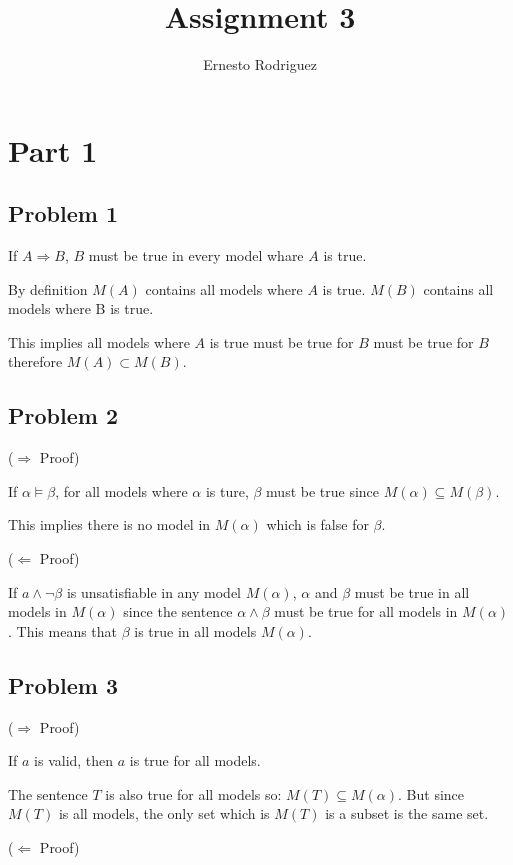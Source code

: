 \documentclass{article}
\title{Assignment 3}
\author{Ernesto Rodriguez}
\begin{document}
\maketitle

\section{Part 1}

\subsection{Problem 1}
If $A \Rightarrow B$, $B$ must be true in every model whare $A$ is true.

By definition $M(A)$ contains all models where $A$ is true. $M(B)$ contains all models where B is true.

This implies all models where $A$ is true must be true for $B$ must be true for $B$ therefore $M(A) \subset M(B)$.

\subsection{Problem 2}

($\Rightarrow$ Proof)

If $\alpha \models \beta$, for all models where $\alpha$ is ture, $\beta$ must be true since $M(\alpha) \subseteq M(\beta)$.

This implies there is no model in $M(\alpha)$ which is false for $\beta$.

($\Leftarrow$ Proof)

If $a \wedge \neg \beta $ is unsatisfiable in any model $M( \alpha )$, $\alpha $ and $\beta $ must be true in all models in $M(  \alpha  )$ since the sentence $ \alpha  \wedge \beta$ must be true for all models in $M( \alpha )$. This means that $\beta$ is true in all models $M( \alpha )$.

\subsection{Problem 3}

($\Rightarrow$ Proof)

If $a$ is valid, then $a$ is true for all models.

The sentence $T$ is also true for all models so: $M(T) \subseteq M( \alpha )$. But since $M(T)$ is all models, the only set which is $M(T)$ is a subset is the same set.

($\Leftarrow$ Proof)
\end{document}
